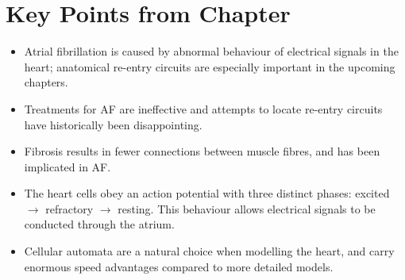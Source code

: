 \section{Key Points from Chapter \thechapter}

\begin{itemize}
    \item Atrial fibrillation is caused by abnormal behaviour of electrical signals in the heart; anatomical re-entry circuits are especially important in the upcoming chapters.
    \item Treatments for AF are ineffective and attempts to locate re-entry circuits have historically been disappointing.
    \item Fibrosis results in fewer connections between muscle fibres, and has been implicated in AF.
    \item The heart cells obey an action potential with three distinct phases: excited $\rightarrow$ refractory $\rightarrow$ resting. This behaviour allows electrical signals to be conducted through the atrium.
    \item Cellular automata are a natural choice when modelling the heart, and carry enormous speed advantages compared to more detailed models.
\end{itemize}

